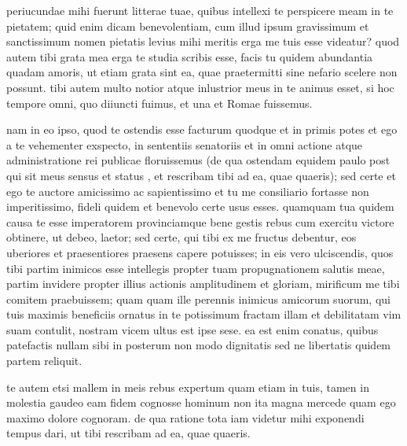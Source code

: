 


 periucundae mihi fuerunt litterae tuae, quibus intellexi te perspicere meam in te pietatem; quid enim dicam benevolentiam, cum illud ipsum gravissimum et sanctissimum nomen pietatis levius mihi meritis erga me tuis esse videatur? quod autem tibi grata mea erga te studia scribis esse, facis tu quidem abundantia quadam amoris, ut etiam grata sint ea, quae praetermitti sine nefario scelere non possunt. tibi autem multo notior atque inlustrior meus in te animus esset, si hoc tempore omni, quo diiuncti fuimus, et una et Romae fuissemus.

 nam in eo ipso, quod te ostendis esse facturum quodque et in primis potes et ego a te vehementer exspecto, in sententiis senatoriis et in omni actione atque administratione rei publicae floruissemus (de qua ostendam equidem paulo post qui sit meus sensus et status , et rescribam tibi ad ea, quae quaeris); sed certe et ego te auctore amicissimo ac sapientissimo et tu me consiliario fortasse non imperitissimo, fideli quidem et benevolo certe usus esses. quamquam tua quidem causa te esse imperatorem provinciamque bene gestis rebus cum exercitu victore obtinere, ut debeo, laetor; sed certe, qui tibi ex me fructus debentur, eos uberiores et praesentiores praesens capere potuisses; in eis vero ulciscendis, quos tibi partim inimicos esse intellegis propter tuam propugnationem salutis meae, partim invidere propter illius actionis amplitudinem et gloriam, mirificum me tibi comitem praebuissem; quam quam ille perennis inimicus amicorum suorum, qui tuis maximis beneficiis ornatus in te potissimum fractam illam et debilitatam vim suam contulit, nostram vicem ultus est ipse sese. ea est enim conatus, quibus patefactis nullam sibi in posterum non modo dignitatis sed ne libertatis quidem partem reliquit.

 te autem etsi mallem in meis rebus expertum quam etiam in tuis, tamen in molestia gaudeo eam fidem cognosse hominum non ita magna mercede quam ego maximo dolore cognoram. de qua ratione tota iam videtur mihi exponendi tempus dari, ut tibi rescribam ad ea, quae quaeris.

